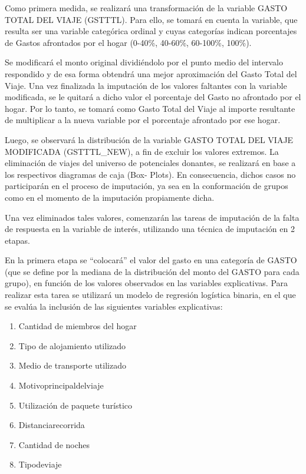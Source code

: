 \documentclass[
  openany]{book}
\begin{document}
Como primera medida, se realizará una transformación de la variable GASTO TOTAL DEL VIAJE (GSTTTL). Para ello, se tomará en cuenta la variable, que resulta ser una variable categórica ordinal y cuyas categorías indican porcentajes de Gastos afrontados por el hogar (0-40\%, 40-60\%, 60-100\%, 100\%).

Se modificará el monto original dividiéndolo por el punto medio del intervalo respondido y de esa forma obtendrá una mejor aproximación del Gasto Total del Viaje. Una vez finalizada la imputación de los valores faltantes con la variable modificada, se le quitará a dicho valor el porcentaje del Gasto no afrontado por el hogar. Por lo tanto, se tomará como Gasto Total del Viaje al importe resultante de multiplicar a la nueva variable por el porcentaje afrontado por ese hogar.

Luego, se observará la distribución de la variable GASTO TOTAL DEL VIAJE MODIFICADA (GSTTTL\_NEW), a fin de excluir los valores extremos. La eliminación de viajes del universo de potenciales donantes, se realizará en base a los respectivos diagramas de caja (Box- Plots). En consecuencia, dichos casos no participarán en el proceso de imputación, ya sea en la conformación de grupos como en el momento de la imputación propiamente dicha.

Una vez eliminados tales valores, comenzarán las tareas de imputación de la falta de respuesta en la variable de interés, utilizando una técnica de imputación en 2 etapas.

En la primera etapa se ``colocará'' el valor del gasto en una categoría de GASTO (que se define por la mediana de la distribución del monto del GASTO para cada grupo), en función de los valores observados en las variables explicativas. Para realizar esta tarea se utilizará un modelo de regresión logística binaria, en el que se evalúa la inclusión de las siguientes variables explicativas:

\begin{enumerate}
\def\labelenumi{\arabic{enumi}.}
\item
  Cantidad de miembros del hogar
\item
  Tipo de alojamiento utilizado
\item
  Medio de transporte utilizado
\item
  Motivoprincipaldelviaje
\item
  Utilización de paquete turístico
\item
  Distanciarecorrida
\item
  Cantidad de noches
\item
  Tipodeviaje
\end{enumerate}
\end{document}
